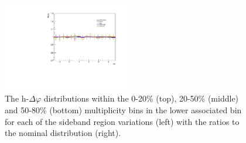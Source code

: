 \begin{figure}[ht]
    \includegraphics[width=0.49\textwidth]{figures/analysis/sideband_variations_dphi_50_80_lowpt_ratio.pdf}
    \caption{The h-\lmb $\Delta\varphi$ distributions within the 0-20\% (top), 20-50\% (middle) and 50-80\% (bottom) multiplicity bins in the lower associated \pt bin for each of the sideband region variations (left) with the ratios to the nominal distribution (right).}
    \label{fig:sideband_region_variations_lowpt}
\end{figure}

